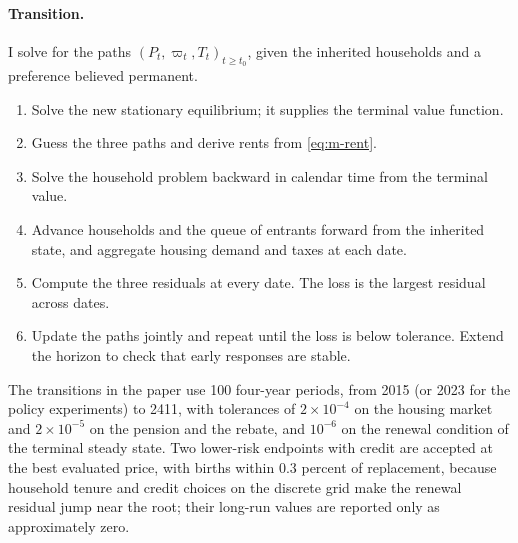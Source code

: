 \paragraph{Transition.} I solve for the paths $(P_t,\varpi_t,T_t)_{t\geq t_0}$,
given the inherited households and a preference believed permanent.
\begin{enumerate}
\item Solve the new stationary equilibrium; it supplies the terminal value
function.
\item Guess the three paths and derive rents from \eqref{eq:m-rent}.
\item Solve the household problem backward in calendar time from the terminal
value.
\item Advance households and the queue of entrants forward from the inherited
state, and aggregate housing demand and taxes at each date.
\item Compute the three residuals at every date. The loss is the largest
residual across dates.
\item Update the paths jointly and repeat until the loss is below tolerance.
Extend the horizon to check that early responses are stable.
\end{enumerate}
The transitions in the paper use 100 four-year periods, from 2015 (or 2023
for the policy experiments) to 2411, with tolerances of $2\times10^{-4}$ on
the housing market and $2\times10^{-5}$ on the pension and the rebate, and
$10^{-6}$ on the renewal condition of the terminal steady state. Two
lower-risk endpoints with credit are accepted at the best evaluated price, with
births within 0.3 percent of replacement, because household tenure and credit
choices on the discrete grid make the renewal residual jump near the root;
their long-run values are reported only as approximately zero.
